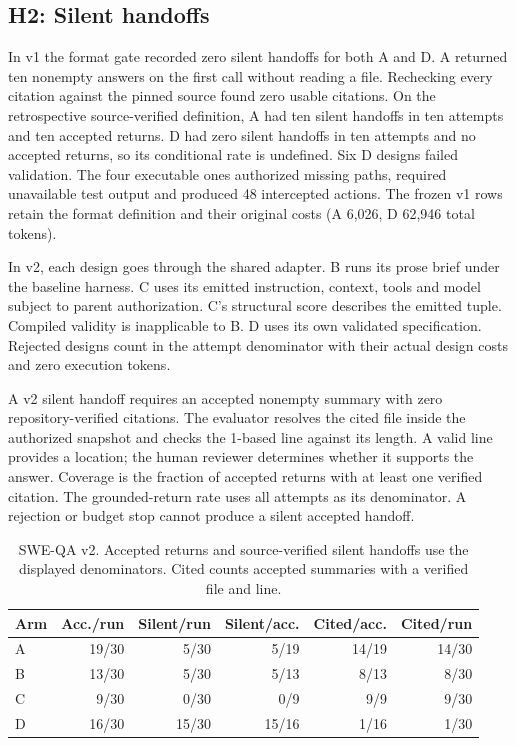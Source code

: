 \documentclass[sigconf,nonacm]{acmart}
\begin{document}
\subsection{H2: Silent handoffs}
In v1 the format gate recorded zero silent handoffs for both A and D.
A returned ten nonempty answers on the first call without reading a file.
Rechecking every citation against the pinned source found zero usable
citations. On the retrospective source-verified definition, A had ten
silent handoffs in ten attempts and ten accepted returns. D had zero
silent handoffs in ten attempts and no accepted returns, so its conditional
rate is undefined. Six D designs failed validation. The four executable
ones authorized missing paths, required unavailable test output and
produced 48 intercepted actions. The frozen v1 rows retain the format
definition and their original costs (A 6,026, D 62,946 total tokens).

In v2, each design goes through the shared adapter. B runs its prose brief
under the baseline harness. C uses its emitted instruction, context, tools
and model subject to parent authorization. C's structural score describes
the emitted tuple. Compiled validity is inapplicable to B.
D uses its own validated specification. Rejected designs count in the
attempt denominator with their actual design costs and zero execution tokens.

A v2 silent handoff requires an accepted nonempty summary with zero
repository-verified citations. The evaluator resolves the cited file
inside the authorized snapshot and checks the 1-based line against its
length. A valid line provides a location; the human reviewer determines
whether it supports the answer. Coverage is the fraction of accepted
returns with at least one verified citation. The grounded-return rate
uses all attempts as its denominator. A rejection or budget stop cannot
produce a silent accepted handoff.

\begin{table}[t]
\caption{SWE-QA v2. Accepted returns and source-verified silent handoffs use the displayed denominators. Cited counts accepted summaries with a verified file and line.}
\centering
\setlength{\tabcolsep}{3pt}
\begin{tabular}{lrrrrr}
\toprule
Arm & Acc./run & Silent/run & Silent/acc. & Cited/acc. & Cited/run \\
\midrule
A & 19/30 & 5/30 & 5/19 & 14/19 & 14/30 \\
B & 13/30 & 5/30 & 5/13 & 8/13 & 8/30 \\
C & 9/30 & 0/30 & 0/9 & 9/9 & 9/30 \\
D & 16/30 & 15/30 & 15/16 & 1/16 & 1/30 \\
\bottomrule
\end{tabular}
\end{table}
\end{document}
